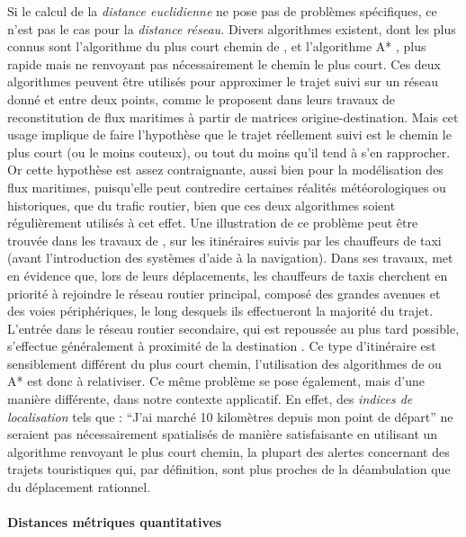 Si le calcul de la \emph{distance euclidienne} ne pose pas de
problèmes spécifiques, ce n'est pas le cas pour la \emph{distance
  réseau.}  Divers algorithmes existent, dont les plus connus sont
l'algorithme du plus court chemin de \textcite{Dijkstra1959}, et
l'algorithme A* \autocite{Hart1968}, plus rapide mais ne renvoyant pas
nécessairement le chemin le plus court. Ces deux algorithmes peuvent
être utilisés pour approximer le trajet suivi sur un réseau donné et
entre deux points, comme le proposent \textcite{Berli2018, Bunel2018}
dans leurs travaux de reconstitution de flux maritimes à partir de
matrices origine-destination. Mais cet usage implique de faire
l'hypothèse que le trajet réellement suivi est le chemin le plus court
(ou le moins couteux), ou tout du moins qu'il tend à s'en
rapprocher. Or cette hypothèse est assez contraignante, aussi bien
pour la modélisation des flux maritimes, puisqu'elle peut contredire
certaines réalités météorologiques ou historiques, que du trafic
routier, bien que ces deux algorithmes soient régulièrement utilisés à
cet effet. Une illustration de ce problème peut être trouvée dans les
travaux de \textcite{Pailhous1970}, sur les itinéraires suivis par les
chauffeurs de taxi (avant l'introduction des systèmes d'aide à la
navigation). Dans ses travaux, \textcite{Pailhous1970} met en évidence
que, lors de leurs déplacements, les chauffeurs de taxis cherchent en
priorité à rejoindre le réseau routier principal, composé des grandes
avenues et des voies périphériques, le long desquels ils effectueront
la majorité du trajet. L'entrée dans le réseau routier secondaire, qui
est repoussée au plus tard possible, s'effectue généralement à
proximité de la destination \autocite{Lagesse2016}. Ce type
d'itinéraire est sensiblement différent du plus court chemin,
l'utilisation des algorithmes de \textcite{Dijkstra1959} ou A*
\autocite{Hart1968} est donc à relativiser. Ce même problème se pose
également, mais d'une manière différente, dans notre contexte
applicatif. En effet, des \emph{indices de localisation} tels que :
\enquote{J'ai marché 10 kilomètres depuis mon point de départ} ne
seraient pas nécessairement spatialisés de manière satisfaisante en
utilisant un algorithme renvoyant le plus court chemin, la plupart des
alertes concernant des trajets touristiques qui, par définition, sont
plus proches de la déambulation que du déplacement rationnel.

\paragraph{Distances métriques quantitatives}
\label{sec:3-1-dist_met_quant}

